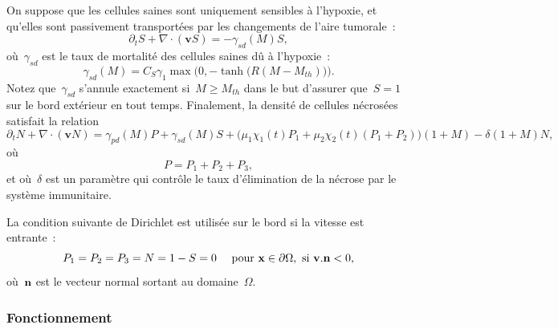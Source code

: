 \documentclass[11pt]{amsart}
\numberwithin{equation}{section}
\newcommand{\chiI}{\chi_1}
\newcommand{\chiS}{\chi_2}
\newcommand{\dive}{\nabla\cdot}
\newcommand{\muI}{\mu_1}
\newcommand{\muS}{\mu_2}
\newcommand{\muN}{\delta}
\newcommand{\nn}{{\bf n}}
\newcommand{\gammapd}{\gamma_{pd}}
\newcommand{\gammasd}{\gamma_{sd}}
\newcommand{\Ms}{M_{th}}
\newcommand{\vit}{\mathbf{v}}
\newcommand{\vecx}{\mathbf{x}}
\begin{document}
On suppose que les cellules saines sont uniquement sensibles à l'hypoxie, et qu'elles sont passivement transportées par les changements de l'aire tumorale~:
\begin{equation}
\partial_t S + \dive(\vit S) =  -\gammasd(M) S, \label{eq_S}
\end{equation}
où~$\gammasd$ est le taux de mortalité des cellules saines dû à l'hypoxie~:
\begin{equation}
\gammasd(M)=C_S \gamma_1  \max\Big(0,-\tanh\big(R(M-\Ms)\big)\Big). \label{eq_gammasd}
\end{equation}
Notez que~$\gammasd$  s'annule exactement si~$M\geq\Ms$ dans le but d'assurer que~$S=1$ sur le bord extérieur en tout temps. Finalement, la densité de cellules nécrosées satisfait la relation 
\begin{equation}\label{eq_N}
\partial_t N + \dive(\vit N) =  \gammapd(M) P +\gammasd(M) S  + \big(\muI \chiI(t)P_1 + \muS\chiS(t)(P_1+P_2)\big)(1+M) - \muN(1+M)N,
\end{equation}
où
\begin{equation}
P = P_1+P_2+P_3,
\end{equation}
et où~$\muN$ est un paramètre qui contrôle le taux d'élimination de la nécrose par le système immunitaire.

La condition suivante de Dirichlet est utilisée sur le bord si la vitesse est entrante~:
\begin{equation}\label{eq_CL_pop}
P_1=P_2=P_3=N=1-S=0  \quad \textrm{ pour } \vecx \in \partial \Omega, \textrm{ si } \vit.\nn<0,
\end{equation}
où~$\nn$ est le vecteur normal sortant au domaine~$\Omega$.
\subsubsection{Fonctionnement}
\end{document}
